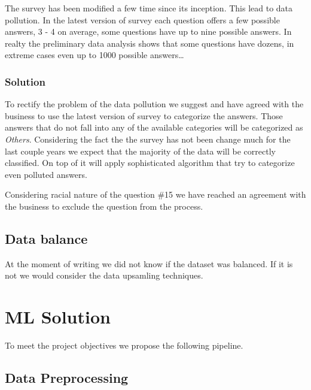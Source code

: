 The survey has been modified a few time since its inception. This lead
to data pollution. In the latest version of survey each question offers
a few possible answers, 3 - 4 on average, some questions have up to nine
possible answers. In realty the preliminary data analysis shows that
some questions have dozens, in extreme cases even up to 1000 possible
answers\ldots{}

\hypertarget{solution}{%
\subsubsection{Solution}\label{solution}}

To rectify the problem of the data pollution we suggest and have agreed
with the business to use the latest version of survey to categorize the
answers. Those answers that do not fall into any of the available
categories will be categorized as \emph{Others}. Considering the fact
the the survey has not been change much for the last couple years we
expect that the majority of the data will be correctly classified. On
top of it will apply sophisticated algorithm that try to categorize even
polluted answers.

Considering racial nature of the question \#15 we have reached an
agreement with the business to exclude the question from the process.

\hypertarget{data-balance}{%
\subsection{Data balance}\label{data-balance}}

At the moment of writing we did not know if the dataset was balanced. If
it is not we would consider the data upsamling techniques.

\hypertarget{ml-solution}{%
\section{ML Solution}\label{ml-solution}}

To meet the project objectives we propose the following pipeline.

\hypertarget{data-preprocessing}{%
\subsection{Data Preprocessing}\label{data-preprocessing}}

